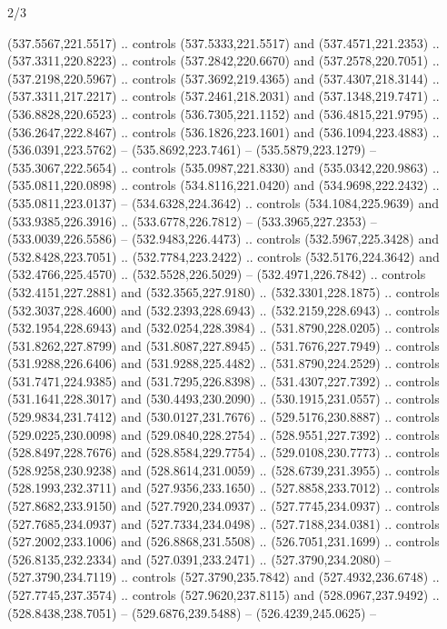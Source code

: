 \begin{flagdescription}{2/3}
\begin{scope}[xshift=0.5\flaglength,yshift=0.5\flagwidth,scale=\flagwidth/495.65]
\begin{scope}[y=0.8pt, x=0.8pt, yscale=-1,shift={(-463.76,-309.78)}]
  (537.5567,221.5517) .. controls (537.5333,221.5517) and (537.4571,221.2353) ..
  (537.3311,220.8223) .. controls (537.2842,220.6670) and (537.2578,220.7051) ..
  (537.2198,220.5967) .. controls (537.3692,219.4365) and (537.4307,218.3144) ..
  (537.3311,217.2217) .. controls (537.2461,218.2031) and (537.1348,219.7471) ..
  (536.8828,220.6523) .. controls (536.7305,221.1152) and (536.4815,221.9795) ..
  (536.2647,222.8467) .. controls (536.1826,223.1601) and (536.1094,223.4883) ..
  (536.0391,223.5762) -- (535.8692,223.7461) -- (535.5879,223.1279) --
  (535.3067,222.5654) .. controls (535.0987,221.8330) and (535.0342,220.9863) ..
  (535.0811,220.0898) .. controls (534.8116,221.0420) and (534.9698,222.2432) ..
  (535.0811,223.0137) -- (534.6328,224.3642) .. controls (534.1084,225.9639) and
  (533.9385,226.3916) .. (533.6778,226.7812) -- (533.3965,227.2353) --
  (533.0039,226.5586) -- (532.9483,226.4473) .. controls (532.5967,225.3428) and
  (532.8428,223.7051) .. (532.7784,223.2422) .. controls (532.5176,224.3642) and
  (532.4766,225.4570) .. (532.5528,226.5029) -- (532.4971,226.7842) .. controls
  (532.4151,227.2881) and (532.3565,227.9180) .. (532.3301,228.1875) .. controls
  (532.3037,228.4600) and (532.2393,228.6943) .. (532.2159,228.6943) .. controls
  (532.1954,228.6943) and (532.0254,228.3984) .. (531.8790,228.0205) .. controls
  (531.8262,227.8799) and (531.8087,227.8945) .. (531.7676,227.7949) .. controls
  (531.9288,226.6406) and (531.9288,225.4482) .. (531.8790,224.2529) .. controls
  (531.7471,224.9385) and (531.7295,226.8398) .. (531.4307,227.7392) .. controls
  (531.1641,228.3017) and (530.4493,230.2090) .. (530.1915,231.0557) .. controls
  (529.9834,231.7412) and (530.0127,231.7676) .. (529.5176,230.8887) .. controls
  (529.0225,230.0098) and (529.0840,228.2754) .. (528.9551,227.7392) .. controls
  (528.8497,228.7676) and (528.8584,229.7754) .. (529.0108,230.7773) .. controls
  (528.9258,230.9238) and (528.8614,231.0059) .. (528.6739,231.3955) .. controls
  (528.1993,232.3711) and (527.9356,233.1650) .. (527.8858,233.7012) .. controls
  (527.8682,233.9150) and (527.7920,234.0937) .. (527.7745,234.0937) .. controls
  (527.7685,234.0937) and (527.7334,234.0498) .. (527.7188,234.0381) .. controls
  (527.2002,233.1006) and (526.8868,231.5508) .. (526.7051,231.1699) .. controls
  (526.8135,232.2334) and (527.0391,233.2471) .. (527.3790,234.2080) --
  (527.3790,234.7119) .. controls (527.3790,235.7842) and (527.4932,236.6748) ..
  (527.7745,237.3574) .. controls (527.9620,237.8115) and (528.0967,237.9492) ..
  (528.8438,238.7051) -- (529.6876,239.5488) -- (526.4239,245.0625) --

\end{scope}
\end{scope}
\end{flagdescription}
